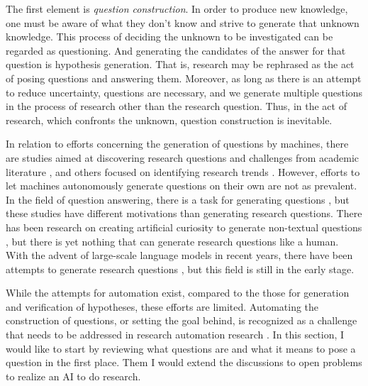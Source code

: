 The first element is \textit{question construction}. In order to produce new knowledge, one must be aware of what they don't know and strive to generate that unknown knowledge. This process of deciding the unknown to be investigated can be regarded as questioning. And generating the candidates of the answer for that question is hypothesis generation. That is, research may be rephrased as the act of posing questions and answering them. Moreover, as long as there is an attempt to reduce uncertainty, questions are necessary, and we generate multiple questions in the process of research other than the research question. Thus, in the act of research, which confronts the unknown, question construction is inevitable.

In relation to efforts concerning the generation of questions by machines, there are studies aimed at discovering research questions and challenges from academic literature \cite{lahav2022search,liu2023creative,oppenlaender2023mapping,surita2020can}, and others focused on identifying research trends \cite{krenn2022scientific,krenn2022predicting}. However, efforts to let machines autonomously generate questions on their own are not as prevalent. In the field of question answering, there is a task for generating questions \cite{pan2019recent,zhang2021review}, but these studies have different motivations than generating research questions. There has been research on creating artificial curiosity to generate non-textual questions \cite{schmidhuber1991possibility}, but there is yet nothing that can generate research questions like a human. With the advent of large-scale language models in recent years, there have been attempts to generate research questions \cite{liu2023creative,lahat2023evaluating}, but this field is still in the early stage.

While the attempts for automation exist, compared to the those for generation and verification of hypotheses, these efforts are limited. Automating the construction of questions, or setting the goal behind, is recognized as a challenge that needs to be addressed in research automation research \cite{coley2020autonomousII,zenil2023,kitano2021nobel}. In this section, I would like to start by reviewing what questions are and what it means to pose a question in the first place. Them I would extend the discussions to open problems to realize an AI to do research.


